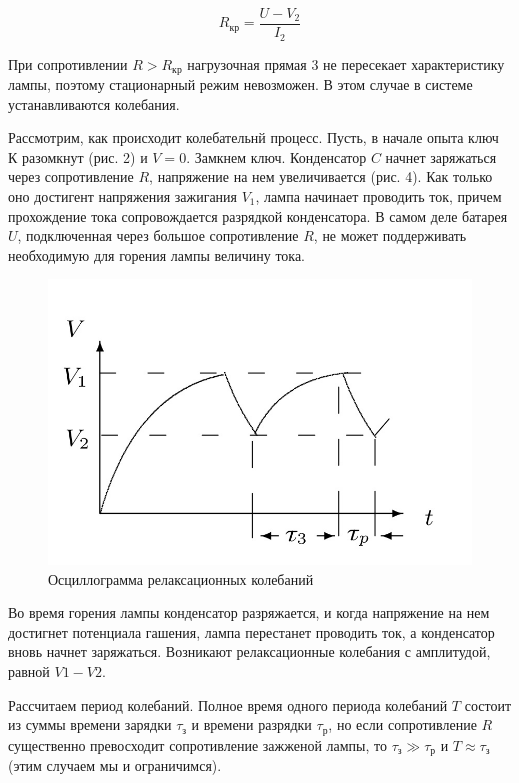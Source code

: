 \documentclass[a4paper, 12pt]{article}
\begin{document}
    \begin{equation}
        R_{кр} = \dfrac{U - V_2}{I_2}
    \end{equation}

    При сопротивлении $R > R_{кр}$ нагрузочная прямая 3 не пересекает характеристику лампы, поэтому стационарный режим невозможен.
    В этом случае в системе устанавливаются колебания.

    Рассмотрим, как происходит колебательнй процесс. Пусть, в начале опыта ключ К разомкнут (рис. 2) и $V = 0$. 
    Замкнем ключ.
    Конденсатор $C$ начнет заряжаться через сопротивление $R$, напряжение на нем увеличивается (рис. 4).
    Как только оно достигент напряжения зажигания $V_1$, лампа начинает проводить ток, причем прохождение тока сопровождается разрядкой конденсатора.
    В самом деле батарея $U$, подключенная через большое сопротивление $R$, не может поддерживать необходимую для горения лампы величину тока.

    \begin{figure}
        \includegraphics[scale=0.2]{pic4.jpg}
        \caption{Осциллограмма релаксационных колебаний}
    \end{figure}

    Во время горения лампы конденсатор разряжается, и когда напряжение на нем достигнет потенциала гашения, лампа перестанет проводить ток, а конденсатор вновь начнет заряжаться. 
    Возникают релаксационные колебания с амплитудой, равной $V1 - V2$.

    Рассчитаем период колебаний.
    Полное время одного периода колебаний $T$ состоит из суммы времени зарядки $\tau_з$ и времени разрядки $\tau_р$, но если сопротивление $R$ существенно превосходит сопротивление зажженой лампы, то $\tau_з \gg \tau_р$ и $T \approx \tau_з$ (этим случаем мы и ограничимся).
    
\end{document}
